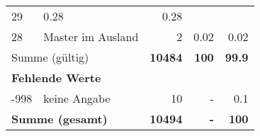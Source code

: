 \begin{longtable}{lXrrr}
       \num{29} &
       \num[round-mode=places,round-precision=2]{0.28} &
         \num[round-mode=places,round-precision=2]{0.28} \\

     28 &
     \multicolumn{1}{X}{ Master im Ausland   } &


       \num{2} &
       \num[round-mode=places,round-precision=2]{0.02} &
         \num[round-mode=places,round-precision=2]{0.02} \\
     \midrule
     \multicolumn{2}{l}{Summe (gültig)} &
       \textbf{\num{10484}} &
     \textbf{\num{100}} &
       \textbf{\num[round-mode=places,round-precision=2]{99.9}} \\
     \multicolumn{5}{l}{\textbf{Fehlende Werte}}\\
       -998 &
       keine Angabe &
         \num{10} &
        - &
         \num[round-mode=places,round-precision=2]{0.1} \\
     \midrule
     \multicolumn{2}{l}{\textbf{Summe (gesamt)}} &
          \textbf{\num{10494}} &
        \textbf{-} &
        \textbf{\num{100}} \\
     \bottomrule
     \end{longtable}
     
